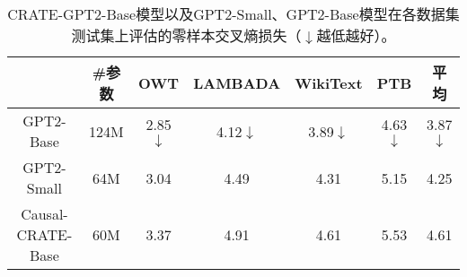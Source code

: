 \documentclass[../../book-main_zh.tex]{subfiles}
\begin{document}
\begin{table}
\def\arraystretch{1.1}
    \small
    \caption{\small CRATE-GPT2-Base模型以及GPT2-Small、GPT2-Base模型在各数据集测试集上评估的零样本交叉熵损失（$\downarrow$越低越好）。
    }
    \centering
    \begin{tabular}{ccccccc}
    \hline
    & \#参数 & \textbf{OWT} & \textbf{LAMBADA} & \textbf{WikiText} & \textbf{PTB} & \textbf{平均} \\
     \hline
     GPT2-Base  & {124M} & 2.85$\downarrow$ & 4.12$\downarrow$ & 3.89$\downarrow$ & 4.63$\downarrow$ & 3.87$\downarrow$ \\
     {GPT2-Small } &  {64M} & {3.04} & {4.49} & {4.31} & {5.15} & {4.25} \\
     Causal-CRATE-Base & {60M} & 3.37 & 4.91 & 4.61 & 5.53 & 4.61 \\
     \hline
    \end{tabular}
    \label{tab:gpt-eval}
\end{table} 






\end{document}
